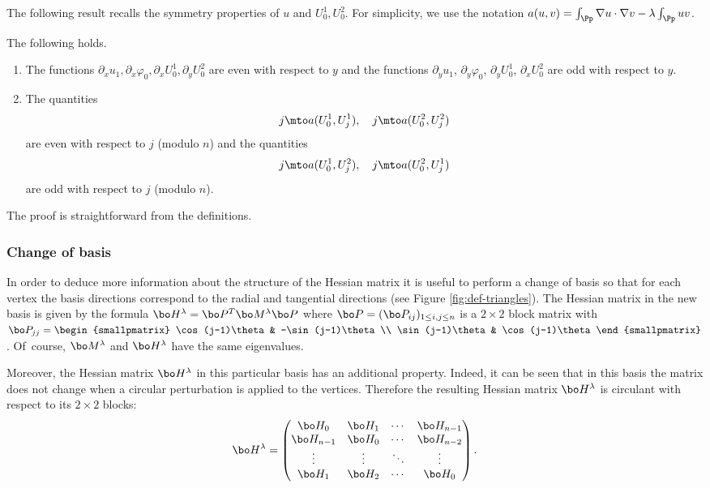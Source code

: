 The following result recalls the symmetry properties of $u$ and $U_0^1,U_0^2$. For simplicity, we use the notation $a(u,v) = \int_{\Pp} \nabla u \cdot \nabla v - \lambda \int_{\Pp} uv$.
\begin{propo}\label{prop:parity-u}
The following holds.
\begin{enumerate}
\item
The functions $\partial_x u_1, \partial_x \varphi_0, \partial_x U_0^1, \partial_y U_0^2$ are even with respect to $y$
and the functions $\partial_y u_1$, $\partial_y \varphi_0$, $\partial_y U_0^1$, $\partial_x U_0^2$ are odd with respect to $y$.

\item
The quantities
\[
j \mto a(U_0^1,U_j^1),\quad j \mto a(U_0^2,U_j^2)
\]
are even with respect to $j$ (modulo $n$)
and the quantities
\[
j \mto a(U_0^1,U_j^2),\quad j \mto a(U_0^2,U_j^1)
\]
are odd with respect to $j$ (modulo $n$).
\end{enumerate}
\end{propo}
The proof is straightforward from the definitions.

\subsubsection*{Change of basis} In order to deduce more information about the structure of the Hessian matrix it is useful to perform a change of basis so that for each vertex the basis directions correspond to the radial and tangential directions (see Figure \ref{fig:def-triangles}). The Hessian matrix in the new basis is given by the formula $\bo H^\lambda = \bo P^T \bo M^\lambda \bo P$ where $\bo P = (\bo P_{ij})_{1\leq i,j\leq n}$ is a $2\times 2$ block matrix with $\bo P_{jj} = \begin{smallpmatrix}
\cos(j-1)\theta & -\sin(j-1)\theta \\
\sin(j-1)\theta & \cos(j-1)\theta
\end{smallpmatrix}$. Of~course, $\bo M^\lambda$ and $\bo H^\lambda$ have the same eigenvalues.

Moreover, the Hessian matrix $\bo H^\lambda$ in this particular basis has an additional property. Indeed, it can be seen that in this basis the matrix does not change when a circular perturbation is applied to the vertices. Therefore the resulting Hessian matrix $\bo H^\lambda$ is circulant with respect to its $2\times 2$ blocks:
\begin{equation}
\bo H^\lambda = \begin{pmatrix}
\bo H_0 & \bo H_1 & \cdots & \bo H_{n-1} \\
\bo H_{n-1} & \bo H_0 & \cdots & \bo H_{n-2} \\
\vdots & \vdots & \ddots & \vdots \\
\bo H_1 & \bo H_2 & \cdots & \bo H_0
\end{pmatrix}.
\label{eq:circulant-hessian}
\end{equation}

